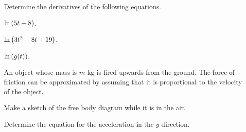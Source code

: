 
\begin{problem}
\item Determine the derivatives of the following equations.
  \begin{subproblem}
    \item $\ln\left( 5t-8\right)$.
      \vfill
    \item $\ln\left( 3t^2 - 8t + 19 \right)$.
      \vfill
    \item $\ln\left( g(t) \right)$.
      \vfill
  \end{subproblem}

  \clearpage

\item An object whose mass is $m$ kg is fired upwards from the ground. The force of
  friction can be approximated by assuming that it is proportional to
  the velocity of the object.

  \begin{subproblem}
  \item Make a sketch of the free body diagram while it is in the air.
    \vfill
  \item Determine the equation for the acceleration in the $y$-direction.
    \vfill
  \end{subproblem}

\end{problem}


